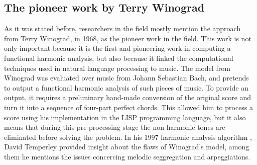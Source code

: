     \subsection{The pioneer work by Terry Winograd}
    As it was stated before, researchers in the field mostly mention the approach from Terry Winograd, in 1968, as the pioneer work in the field. This work is not only important because it is the first and pioneering work in computing a functional harmonic analysis, but also because it linked the computational techniques used in natural language processing to music. The model from Winograd was evaluated over music from Johann Sebastian Bach, and pretends to output a functional harmonic analysis of such pieces of music. To provide an output, it requires a preliminary hand-made conversion of the original score and turn it into a sequence of four-part perfect chords. This allowed him to process a score using his implementation in the LISP programming language, but it also means that during this pre-processing stage the non-harmonic tones are eliminated before solving the problem. In his 1997 harmonic analysis algorithm \cite{temperley1997algorithm}, David Temperley provided insight about the flaws of Winograd's model, among them he mentions the issues concercing melodic seggregation and arpeggiations.
